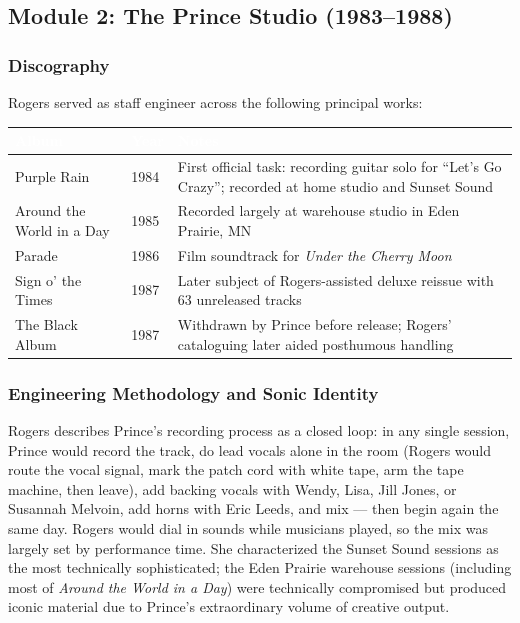 \documentclass[11pt,letterpaper]{article}
\newcommand{\tableheader}[1]{\textbf{\sffamily\textcolor{white}{#1}}}
\begin{document}
\subsection{Module 2: The Prince Studio (1983--1988)}

\subsubsection{Discography}

Rogers served as staff engineer across the following principal works:

\begin{center}
\begin{tabularx}{\textwidth}{L{5cm}C{2cm}X}
\toprule
{}
\tableheader{Album} & \tableheader{Year} & \tableheader{Notes} \\
\midrule
Purple Rain & 1984 & First official task: recording guitar solo for ``Let's Go Crazy''; recorded at home studio and Sunset Sound \\
Around the World in a Day & 1985 & Recorded largely at warehouse studio in Eden Prairie, MN \\
Parade & 1986 & Film soundtrack for \textit{Under the Cherry Moon} \\
Sign o' the Times & 1987 & Later subject of Rogers-assisted deluxe reissue with 63 unreleased tracks \\
The Black Album & 1987 & Withdrawn by Prince before release; Rogers' cataloguing later aided posthumous handling \\
\bottomrule
\end{tabularx}
\end{center}

\subsubsection{Engineering Methodology and Sonic Identity}

Rogers describes Prince's recording process as a closed loop: in any single session, Prince would record the track, do lead vocals alone in the room (Rogers would route the vocal signal, mark the patch cord with white tape, arm the tape machine, then leave), add backing vocals with Wendy, Lisa, Jill Jones, or Susannah Melvoin, add horns with Eric Leeds, and mix --- then begin again the same day. Rogers would dial in sounds while musicians played, so the mix was largely set by performance time. She characterized the Sunset Sound sessions as the most technically sophisticated; the Eden Prairie warehouse sessions (including most of \textit{Around the World in a Day}) were technically compromised but produced iconic material due to Prince's extraordinary volume of creative output.
\end{document}
